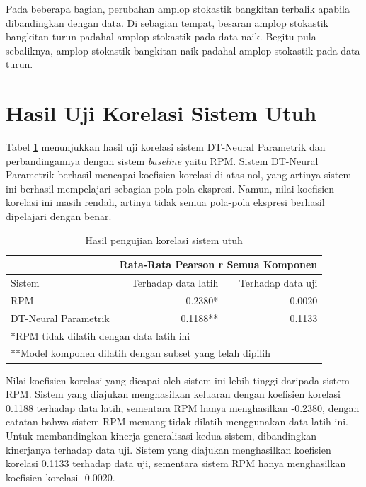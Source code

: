 Pada beberapa bagian, perubahan amplop stokastik bangkitan terbalik apabila dibandingkan dengan data. Di sebagian tempat, besaran amplop stokastik bangkitan turun padahal amplop stokastik pada data naik. Begitu pula sebaliknya, amplop stokastik bangkitan naik padahal amplop stokastik pada data turun. %


\section{Hasil Uji Korelasi Sistem Utuh} \label{section-wholesystem-corrcoef-test}
Tabel \ref{tab-system-testing-results} menunjukkan hasil uji korelasi sistem DT-Neural Parametrik dan perbandingannya dengan sistem \textit{baseline} yaitu RPM. Sistem DT-Neural Parametrik berhasil mencapai koefisien korelasi di atas nol, yang artinya sistem ini berhasil mempelajari sebagian pola-pola ekspresi. Namun, nilai koefisien korelasi ini masih rendah, artinya tidak semua pola-pola ekspresi berhasil dipelajari dengan benar.

\begin{table}[htbp]
    \centering
    \caption{Hasil pengujian korelasi sistem utuh}\label{tab-system-testing-results}
    \begin{tabular}{ |l|r|r| } 
     \cline{2-3}
     \multicolumn{1}{l|}{}&\multicolumn{2}{|l|}{Rata-Rata Pearson r Semua Komponen}\\\hline
     Sistem&Terhadap data latih&Terhadap data uji\\\hline
	 RPM&-0.2380* &-0.0020\\\hline
	 DT-Neural Parametrik& 0.1188**&0.1133\\\hline
	 \multicolumn{3}{l}{*RPM tidak dilatih dengan data latih ini}\\
	 \multicolumn{3}{l}{**Model komponen dilatih dengan subset yang telah dipilih}\\
    \end{tabular}
\end{table}

Nilai koefisien korelasi yang dicapai oleh sistem ini lebih tinggi daripada sistem RPM. Sistem yang diajukan menghasilkan keluaran dengan koefisien korelasi 0.1188 terhadap data latih, sementara RPM hanya menghasilkan -0.2380, dengan catatan bahwa sistem RPM memang tidak dilatih menggunakan data latih ini. Untuk membandingkan kinerja generalisasi kedua sistem, dibandingkan kinerjanya terhadap data uji. Sistem yang diajukan menghasilkan koefisien korelasi 0.1133 terhadap data uji, sementara sistem RPM hanya menghasilkan koefisien korelasi -0.0020.

